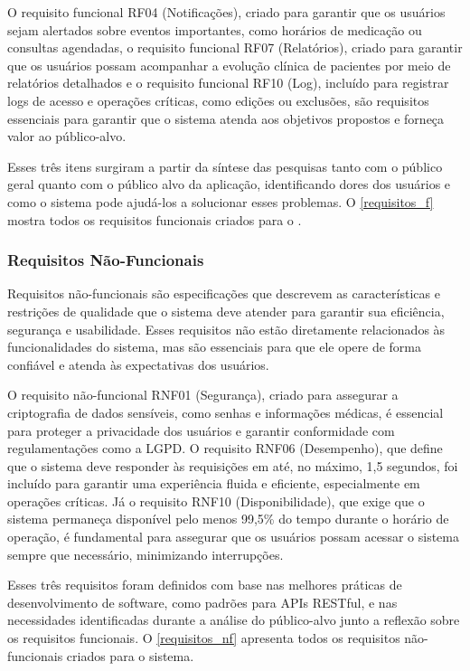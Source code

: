 \documentclass[
	article,			%
	12pt,				%
	oneside,			%
	a4paper,			%
    BIBLATEX,           %
	english,			%
	brazil,				%
	sumario=tradicional
	]{abntex2}
\begin{document}
O requisito funcional RF04 (Notificações), criado para garantir que os usuários sejam alertados sobre eventos importantes, como horários de medicação ou consultas agendadas, o requisito funcional RF07 (Relatórios), criado para garantir que os usuários possam acompanhar a evolução clínica de pacientes por meio de relatórios detalhados e o requisito funcional RF10 (Log), incluído para registrar logs de acesso e operações críticas, como edições ou exclusões, são requisitos essenciais para garantir que o sistema atenda aos objetivos propostos e forneça valor ao público-alvo. 

Esses três itens surgiram a partir da síntese das pesquisas tanto com o público geral quanto com o público alvo da aplicação, identificando dores dos usuários e como o sistema pode ajudá-los a solucionar esses problemas. O \autoref{requisitos_f} mostra todos os requisitos funcionais criados para o \nomeprojeto.

\subsubsection{Requisitos Não-Funcionais}

Requisitos não-funcionais são especificações que descrevem as características e restrições de qualidade que o sistema deve atender para garantir sua eficiência, segurança e usabilidade. Esses requisitos não estão diretamente relacionados às funcionalidades do sistema, mas são essenciais para que ele opere de forma confiável e atenda às expectativas dos usuários.

O requisito não-funcional RNF01 (Segurança), criado para assegurar a criptografia de dados sensíveis, como senhas e informações médicas, é essencial para proteger a privacidade dos usuários e garantir conformidade com regulamentações como a LGPD. O requisito RNF06 (Desempenho), que define que o sistema deve responder às requisições em até, no máximo, 1,5 segundos, foi incluído para garantir uma experiência fluida e eficiente, especialmente em operações críticas. Já o requisito RNF10 (Disponibilidade), que exige que o sistema permaneça disponível pelo menos 99,5\% do tempo durante o horário de operação, é fundamental para assegurar que os usuários possam acessar o sistema sempre que necessário, minimizando interrupções.

Esses três requisitos foram definidos com base nas melhores práticas de desenvolvimento de software, como padrões para APIs RESTful, e nas necessidades identificadas durante a análise do público-alvo junto a reflexão sobre os requisitos funcionais. O \autoref{requisitos_nf} apresenta todos os requisitos não-funcionais criados para o sistema.
\end{document}
